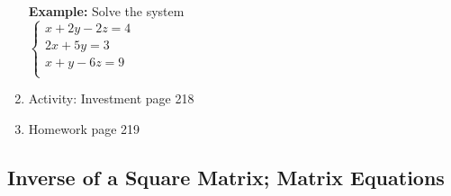 \documentclass[12pt]{amsart}
\begin{document}
\begin{enumerate}
\vspace{4in}



\textbf{Example:} Solve the system \\

$\begin{cases}
x + 2y - 2z  = 4 \\
2x + 5y = 3\\
x + y - 6z = 9 \\

\end{cases} $

\vspace{4in}


\item Activity: Investment page 218

\vspace{8in}

\item Homework page 219\\

\end{enumerate}




\newpage
\subsection{Inverse of a Square Matrix; Matrix Equations}
\end{document}
